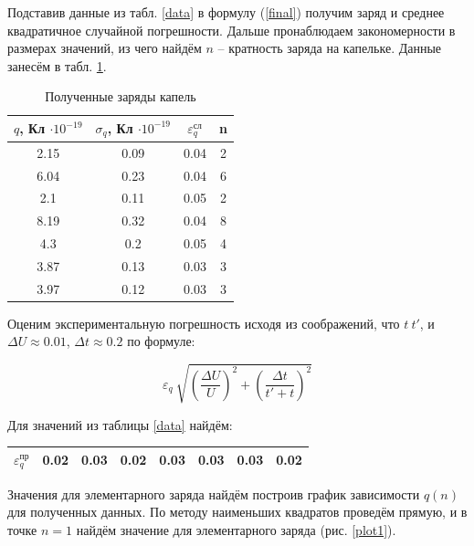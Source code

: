 \documentclass[a4paper,12pt]{article} %
\begin{document}
Подставив данные из табл. \ref{data} в формулу (\ref{final}) получим заряд и среднее квадратичное случайной погрешности. Дальше пронаблюдаем закономерности в размерах значений, из чего найдём $n$ -- кратность заряда на капельке. Данные занесём в табл. \ref{charges}.

\begin{table}[h]
\centering
\begin{tabular}{|c|c|c|c|}
\hline 
$q$, Кл $\cdot 10^{-19}$ & $\sigma_q$, Кл $\cdot 10^{-19}$ & $\varepsilon_q^\text{сл}$ & n \\ 
\hline 
2.15 & 0.09 & 0.04 & 2 \\ 
\hline 
6.04 & 0.23 & 0.04 & 6 \\ 
\hline 
2.1 & 0.11 & 0.05 & 2 \\ 
\hline 
8.19 & 0.32 & 0.04 & 8 \\ 
\hline 
4.3 & 0.2 & 0.05 & 4 \\ 
\hline 
3.87 & 0.13 & 0.03 & 3 \\ 
\hline 
3.97 & 0.12 & 0.03 & 3 \\ 
\hline 
\end{tabular} 
\caption{Полученные заряды капель}
\label{charges}
\end{table}

Оценим экспериментальную погрешность исходя из соображений, что $t ~ t'$, и $\Delta U \approx 0.01$, $\Delta t \approx 0.2$ по формуле:

\[
\varepsilon_q ~ \sqrt{\left( \frac{\Delta U}{U} \right)^2 + \left( \frac{\Delta t}{t' + t} \right)^2}
\]

\noindent Для значений из таблицы \ref{data} найдём:

\begin{center}
\begin{tabular}{|c|c|c|c|c|c|c|c|}
\hline 
$\varepsilon_q^\text{пр}$ & 0.02 & 0.03 & 0.02 & 0.03 & 0.03 & 0.03 & 0.02 \\ 
\hline 
\end{tabular} 
\end{center}

Значения для элементарного заряда найдём построив график зависимости $q(n)$ для полученных данных. По методу наименьших квадратов проведём прямую, и в точке $n = 1$ найдём значение для элементарного заряда (рис. \ref{plot1}).
\end{document}
